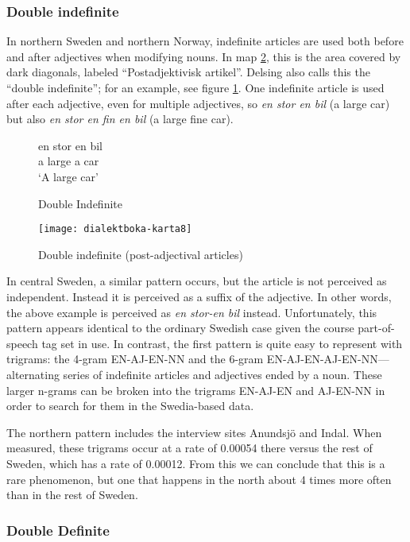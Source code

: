 \subsubsection{Double indefinite}

In northern Sweden and northern Norway, indefinite articles are used
both before and after adjectives when modifying nouns. In map
\ref{double-indefinite-map}, this is the area covered by dark
diagonals, labeled ``Postadjektivisk artikel''. Delsing also calls
this the ``double indefinite''; for an example, see figure
\ref{double-indefinite-example}. One indefinite article is used after
each adjective, even for multiple adjectives, so {\it en stor en bil}
(a large car) but also {\it en stor en fin en bil} (a large fine car).

\begin{figure}
 \gll en stor en bil \\
  a large a car \\
  \trans `A large car'
  \caption{Double Indefinite}
  \label{double-indefinite-example}
\end{figure}

\begin{figure}
  \texttt{[image: dialektboka-karta8]}
  \caption{Double indefinite (post-adjectival articles)}
  \label{double-indefinite-map}
\end{figure}

In central Sweden, a similar pattern occurs, but the article is not
perceived as independent. Instead it is perceived as a suffix of the
adjective. In other words, the above example is perceived as {\it en
  stor-en bil} instead. Unfortunately, this pattern appears identical
to the ordinary Swedish case given the course part-of-speech tag set
in use.  In contrast, the first pattern is quite easy to represent
with trigrams: the 4-gram EN-AJ-EN-NN and the
6-gram EN-AJ-EN-AJ-EN-NN---alternating series of indefinite articles
and adjectives ended by a noun. These larger n-grams can be broken into
the trigrams EN-AJ-EN and AJ-EN-NN in order to search for them in the
Swedia-based data.

The northern pattern includes the interview sites Anundsj\"o and
Indal. When measured, these trigrams occur at a rate of 0.00054 there
versus the rest of Sweden, which has a rate of 0.00012. From this we
can conclude that this is a rare phenomenon, but one that happens in
the north about 4 times more often than in the rest of Sweden.

\subsubsection{Double Definite}

